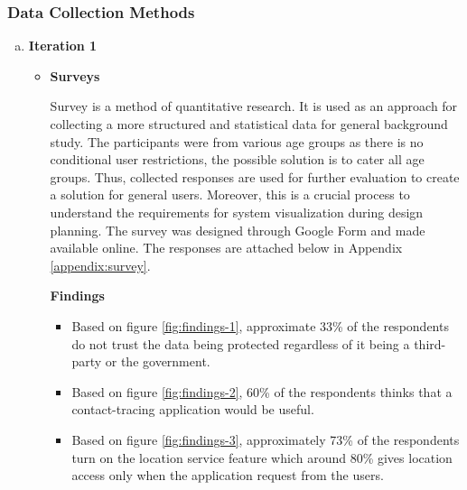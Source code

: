     \subsubsection{Data Collection Methods}
      \begin{enumerate}[a)]
        \item \textbf{Iteration 1}
          \begin{itemize}
            \item \textbf{Surveys}
              \par Survey is a method of quantitative research. It is used as an approach for collecting a more structured
              and statistical data for general background study. The participants were from various age groups as
              there is no conditional user restrictions, the possible solution is to cater all age groups. Thus, collected
              responses are used for further evaluation to create a solution for general users. Moreover, this is a
              crucial process to understand the requirements for system visualization during design planning. The
              survey was designed through Google Form and made available online. The responses are attached
              below in Appendix \ref{appendix:survey}.
              \par \textbf{Findings}
              \begin{itemize}
                \item Based on figure \ref{fig:findings-1}, approximate 33\% of the respondents do not trust the data being protected
                regardless of it being a third-party or the government.
                \item Based on figure \ref{fig:findings-2}, 60\% of the respondents thinks that a contact-tracing application would be useful.
                \item Based on figure \ref{fig:findings-3}, approximately 73\% of the respondents turn on the location service feature which
                around 80\% gives location access only when the application request from the users.
              \end{itemize}
              \begin{figure}[H]
                \centering

\end{figure}
\end{itemize}
\end{enumerate}
